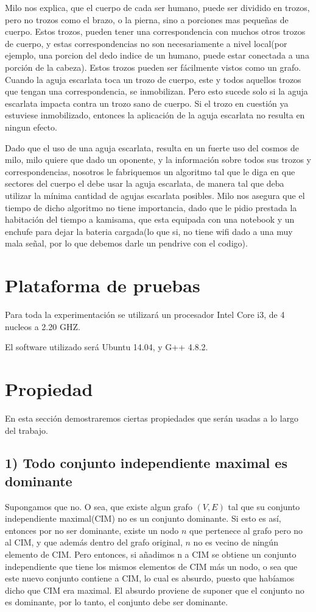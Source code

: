 \documentclass[a4paper]{article}
\begin{document}
\begin{enumerate}
Milo nos explica, que el cuerpo de cada ser humano, puede ser dividido en trozos, pero no trozos como el brazo, o la pierna, sino a porciones mas pequeñas de cuerpo. Estos trozos, pueden tener una correspondencia con muchos otros trozos de cuerpo, y estas correspondencias no son necesariamente a nivel local(por ejemplo, una porcion del dedo indice de un humano, puede estar conectada a una porción de la cabeza). Estos trozos pueden ser fácilmente vistos como un grafo. Cuando la aguja escarlata toca un trozo de cuerpo, este y todos aquellos trozos que tengan una correspondencia, se inmobilizan. Pero esto sucede solo si la aguja escarlata impacta contra un trozo sano de cuerpo. Si el trozo en cuestión ya estuviese inmobilizado, entonces la aplicación de la aguja escarlata no resulta en ningun efecto.

Dado que el uso de una aguja escarlata, resulta en un fuerte uso del cosmos de milo, milo quiere que dado un oponente, y la información sobre todos sus trozos y correspondencias, nosotros le fabriquemos un algoritmo tal que le diga en que sectores del cuerpo el debe usar la aguja escarlata, de manera tal que deba utilizar la mínima cantidad de agujas escarlata posibles. Milo nos asegura que el tiempo de dicho algoritmo no tiene importancia, dado que le pidio prestada la habitación del tiempo a kamisama, que esta equipada con una notebook y un enchufe para dejar la bateria cargada(lo que si, no tiene wifi dado a una muy mala señal, por lo que debemos darle un pendrive con el codigo).


\end{enumerate} 

\section{Plataforma de pruebas}

Para toda la experimentación se utilizará un procesador Intel Core i3, de 4 nucleos a 2.20 GHZ.

El software utilizado será Ubuntu 14.04, y G++ 4.8.2.
\newpage
\section{Propiedad}
En esta sección demostraremos ciertas propiedades que serán usadas a lo largo del trabajo.

\subsection{1) Todo conjunto independiente maximal es dominante}
Supongamos que no. O sea, que existe algun grafo $(V,E)$ tal que su conjunto independiente maximal(CIM) no es un conjunto dominante. Si esto es así, entonces por no ser dominante, existe un nodo $n$ que pertenece al grafo pero no al CIM, y que además dentro del grafo original, $n$ no es vecino de ningún elemento de CIM. Pero entonces, si añadimos n a CIM se obtiene un conjunto independiente que tiene los mismos elementos de CIM más un nodo, o sea que este nuevo conjunto contiene a CIM, lo cual es absurdo, puesto que habíamos dicho que CIM era maximal. El absurdo proviene de suponer que el conjunto no es dominante, por lo tanto, el conjunto debe ser dominante.
\end{document}
